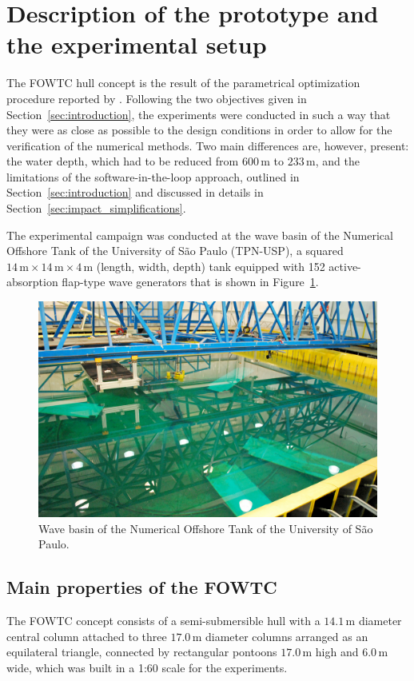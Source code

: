 \section{Description of the prototype and the experimental setup} \label{sec:description_experiment}
The FOWTC hull concept is the result of the parametrical optimization procedure reported by \citet{mas2022parametric}. Following the two objectives given in Section~\ref{sec:introduction}, the experiments were conducted in such a way that they were as close as possible to the design conditions in order to allow for the verification of the numerical methods. Two main differences are, however, present: the water depth, which had to be reduced from $600\,\text{m}$ to $233\,\text{m}$, and the limitations of the software-in-the-loop approach, outlined in Section~\ref{sec:introduction} and discussed in details in Section~\ref{sec:impact_simplifications}.

The experimental campaign was conducted at the wave basin of the Numerical Offshore Tank of the University of São Paulo (TPN-USP), a squared $14\,\text{m}\times 14\,\text{m} \times 4\,\text{m}$ (length, width, depth) tank equipped with 152 active-absorption flap-type wave generators that is shown in Figure~\ref{fig:description_experiment:tanque}.
\begin{figure}[!hbtp]
	\centering
	\includegraphics[width=0.5\columnwidth]{./figures/CH-tpn.jpg}%
	\caption{Wave basin of the Numerical Offshore Tank of the University of São Paulo.} \label{fig:description_experiment:tanque}%
\end{figure}%


\subsection{Main properties of the FOWTC}
The FOWTC concept consists of a semi-submersible hull with a $14.1\,\text{m}$ diameter central column attached to three $17.0\,\text{m}$ diameter columns arranged as an equilateral triangle, connected by rectangular pontoons $17.0\,\text{m}$ high and $6.0\,\text{m}$ wide, which was built in a 1:60 scale for the experiments. 

